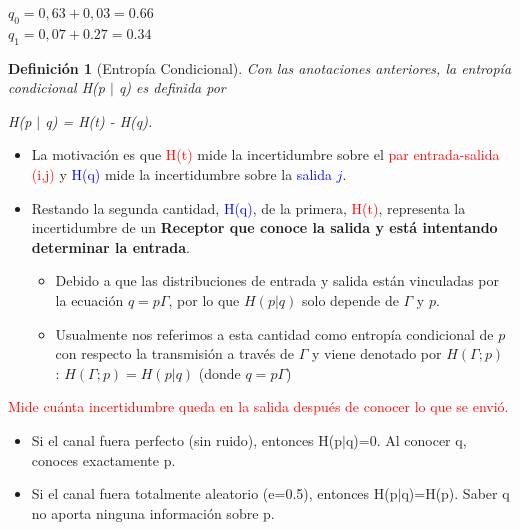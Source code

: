 \documentclass{beamer}
\theoremstyle{plain}
\newtheorem{definicion} [Definicion]{Definición}
\theoremstyle{example}
\theoremstyle{example}
\begin{document}
\begin{frame}
\begin{enumerate}
\begin{center}
$q_0	 = 0,63 + 0,03 =0.66$ \\
$q_1	 = 0,07 + 0.27 =0.34$
\end{center}

\end{enumerate}

\vspace{0.3cm}

\end{frame} 



\begin{frame}  \small 


\begin{definicion} [Entropía Condicional]

Con las anotaciones anteriores, la entropía condicional H(p $|$ q) es definida por 

\begin{center}
H(p $|$ q) = H(t) - H(q).
\end{center}
\end{definicion}

\begin{itemize}
\item  La motivación es que \textcolor{red}{H(t)} mide la incertidumbre sobre el \textcolor{red}{par entrada-salida (i,j)} y \textcolor{blue}{H(q)} mide la incertidumbre sobre la \textcolor{blue}{salida $j$}. 

\item  Restando la segunda cantidad, \textcolor{blue}{H(q)}, de la primera, \textcolor{red}{H(t)}, representa la incertidumbre de un \textbf{Receptor que conoce la salida y está intentando determinar la entrada}.

\begin{itemize}\footnotesize
\item  Debido a que las distribuciones de entrada y salida están vinculadas por la ecuación $q=p\Gamma$, por lo que $H(p|q)$ solo depende de $\Gamma$ y $p$. 

\item  Usualmente nos referimos a esta cantidad como entropía condicional de $p$ con respecto la transmisión a través de $\Gamma$ y viene denotado por $H(\Gamma;p)$ : $H(\Gamma;p) = H(p|q)$ (donde $q=p\Gamma$) 
 \end{itemize}
\end{itemize}

\textcolor{red}{Mide cuánta incertidumbre queda en la salida después de conocer lo que se envió.}

\begin{itemize}\tiny
    \item Si el canal fuera perfecto (sin ruido), entonces H(p$|$q)=0. Al conocer q, conoces exactamente p.
    \item Si el canal fuera totalmente aleatorio (e=0.5), entonces H(p$|$q)=H(p). Saber q no aporta ninguna información sobre p.
\end{itemize}

\end{frame} 
\end{document}
